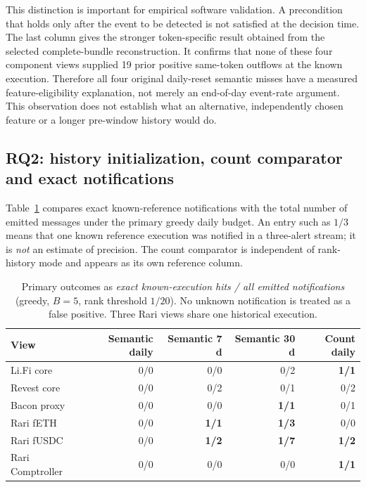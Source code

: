\documentclass[preprint,12pt,authoryear]{elsarticle}
\begin{document}
This distinction is important for empirical software validation. A precondition that holds only after the event to be detected is not satisfied at the decision time. The last column gives the stronger token-specific result obtained from the selected complete-bundle reconstruction. It confirms that none of these four component views supplied 19 prior positive same-token outflows at the known execution. Therefore all four original daily-reset semantic misses have a measured feature-eligibility explanation, not merely an end-of-day event-rate argument. This observation does not establish what an alternative, independently chosen feature or a longer pre-window history would do.

\subsection{RQ2: history initialization, count comparator and exact notifications}
Table~\ref{tab:outcomes} compares exact known-reference notifications with the total number of emitted messages under the primary greedy daily budget. An entry such as $1/3$ means that one known reference execution was notified in a three-alert stream; it is \emph{not} an estimate of precision. The count comparator is independent of rank-history mode and appears as its own reference column.

\begin{table}[htbp]
\centering\scriptsize
\caption{Primary outcomes as \emph{exact known-execution hits / all emitted notifications} (greedy, $B=5$, rank threshold $1/20$). No unknown notification is treated as a false positive. Three Rari views share one historical execution.}
\label{tab:outcomes}
\begin{tabular}{lrrrr}
\toprule
View & Semantic daily & Semantic 7 d & Semantic 30 d & Count daily \\
\midrule
Li.Fi core & 0/0 & 0/0 & 0/2 & \textbf{1/1} \\
Revest core & 0/0 & 0/2 & 0/1 & 0/2 \\
Bacon proxy & 0/0 & 0/0 & \textbf{1/1} & 0/1 \\
Rari fETH & 0/0 & \textbf{1/1} & \textbf{1/3} & 0/0 \\
Rari fUSDC & 0/0 & \textbf{1/2} & \textbf{1/7} & \textbf{1/2} \\
Rari Comptroller & 0/0 & 0/0 & 0/0 & \textbf{1/1} \\
\bottomrule
\end{tabular}
\end{table}
\end{document}
